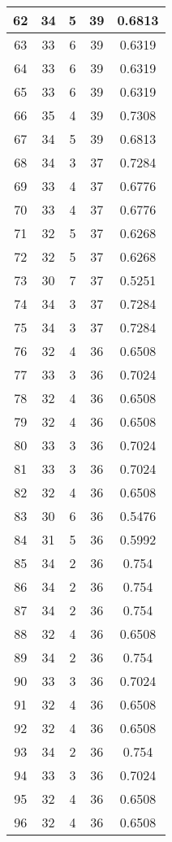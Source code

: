 \documentclass[letterpaper, 12pt]{article}
\begin{document}
\begin{longtable}{|c|c|c|c|c|}
\hline
62 & 34 & 5 & 39 & 0.6813 \\
\hline
63 & 33 & 6 & 39 & 0.6319 \\
\hline
64 & 33 & 6 & 39 & 0.6319 \\
\hline
65 & 33 & 6 & 39 & 0.6319 \\
\hline
66 & 35 & 4 & 39 & 0.7308 \\
\hline
67 & 34 & 5 & 39 & 0.6813 \\
\hline
68 & 34 & 3 & 37 & 0.7284 \\
\hline
69 & 33 & 4 & 37 & 0.6776 \\
\hline
70 & 33 & 4 & 37 & 0.6776 \\
\hline
71 & 32 & 5 & 37 & 0.6268 \\
\hline
72 & 32 & 5 & 37 & 0.6268 \\
\hline
73 & 30 & 7 & 37 & 0.5251 \\
\hline
74 & 34 & 3 & 37 & 0.7284 \\
\hline
75 & 34 & 3 & 37 & 0.7284 \\
\hline
76 & 32 & 4 & 36 & 0.6508 \\
\hline
77 & 33 & 3 & 36 & 0.7024 \\
\hline
78 & 32 & 4 & 36 & 0.6508 \\
\hline
79 & 32 & 4 & 36 & 0.6508 \\
\hline
80 & 33 & 3 & 36 & 0.7024 \\
\hline
81 & 33 & 3 & 36 & 0.7024 \\
\hline
82 & 32 & 4 & 36 & 0.6508 \\
\hline
83 & 30 & 6 & 36 & 0.5476 \\
\hline
84 & 31 & 5 & 36 & 0.5992 \\
\hline
85 & 34 & 2 & 36 & 0.754 \\
\hline
86 & 34 & 2 & 36 & 0.754 \\
\hline
87 & 34 & 2 & 36 & 0.754 \\
\hline
88 & 32 & 4 & 36 & 0.6508 \\
\hline
89 & 34 & 2 & 36 & 0.754 \\
\hline
90 & 33 & 3 & 36 & 0.7024 \\
\hline
91 & 32 & 4 & 36 & 0.6508 \\
\hline
92 & 32 & 4 & 36 & 0.6508 \\
\hline
93 & 34 & 2 & 36 & 0.754 \\
\hline
94 & 33 & 3 & 36 & 0.7024 \\
\hline
95 & 32 & 4 & 36 & 0.6508 \\
\hline
96 & 32 & 4 & 36 & 0.6508 \\

\end{longtable}
\end{document}
